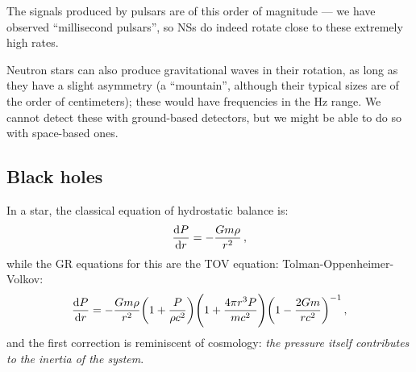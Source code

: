 \documentclass[main.tex]{subfiles}
\begin{document}
The signals produced by pulsars are of this order of magnitude --- we have observed ``millisecond pulsars'', so NSs do indeed rotate close to these extremely high rates.

Neutron stars can also produce gravitational waves in their rotation, as long as they have a slight asymmetry (a ``mountain'', although their typical sizes are of the order of centimeters); these would have frequencies in the Hz range. We cannot detect these with ground-based detectors, but we might be able to do so with space-based ones. 

\subsection{Black holes}


In a star, the classical equation of hydrostatic balance is:
%
\begin{align}
\dv{P}{r} = - \frac{Gm \rho }{r^2}
\,,
\end{align}
%
while the GR equations for this are the TOV equation: Tolman-Oppenheimer-Volkov: 
%
\begin{align}
\dv{P}{r} = - \frac{Gm  \rho }{r^2} \qty(1 + \frac{P}{\rho c^2}) \qty(1 + \frac{4 \pi r^3 P}{m c^2}) \qty(1 - \frac{2Gm}{rc^2})^{-1}
\,,
\end{align}
%
and the first correction is reminiscent of cosmology: \emph{the pressure itself contributes to the inertia of the system}. 
\end{document}
